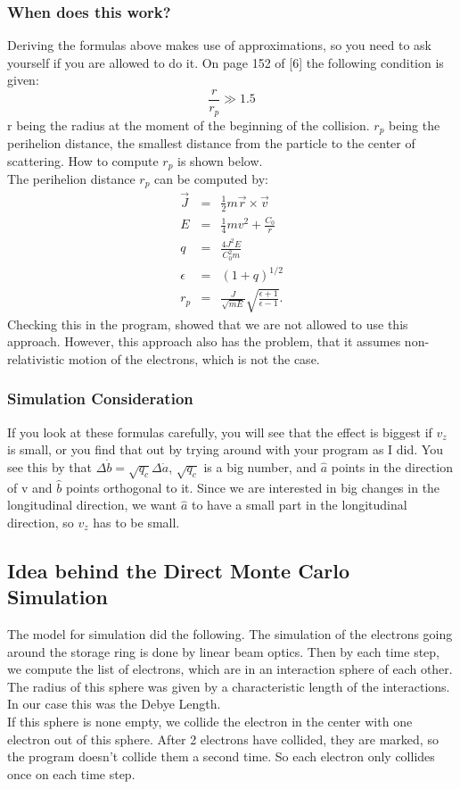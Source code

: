 \subsubsection{When does this work?}
Deriving the formulas above makes use of approximations, so you need to ask yourself if you are allowed to do it. On page 152 of [6] the following condition is given:
\begin{equation} \frac r {r_p} \gg 1.5 \end{equation}
r being the radius at the moment of the beginning of the collision. $r_p$ being the perihelion distance, the smallest distance from the particle to the center of scattering. How to compute $r_p$ is shown below.\\
The perihelion distance $r_p$  can be computed by:
\begin{eqnarray}
\vec J &=& \frac 1 2 m \vec r \times \vec v \\
E &=& \frac 1 4 m v^2 + \frac{C_0} r \\
q &=& \frac{ 4 J^2 E}{C_0^2 m} \\
\epsilon &=& (1 + q)^{1/2} \\
r_p &=& \frac J {\sqrt{m E}} \sqrt{\frac{\epsilon + 1}{\epsilon -1}}.
\end{eqnarray}
Checking this in the program, showed that we are not allowed to use this approach. However, this approach also has the problem, that it assumes non-relativistic motion of the electrons, which is not the case.

\subsubsection{Simulation Consideration}
If you look at these formulas carefully, you will see that the effect is biggest if $v_z$ is small, or you find that out by trying around with your program as I did. You see this by that $\Delta \dot b = \sqrt{q_c} \Delta \dot a$, $\sqrt{q_c}$ is a big number, and $\hat a$ points in the direction of v and $\hat b$ points orthogonal to it. Since we are interested in big changes in the longitudinal direction, we want $\hat a$ to have a small part in the longitudinal direction, so $v_z$ has to be small.

\subsection{Idea behind the Direct Monte Carlo Simulation}
The model for simulation did the following. The simulation of the electrons going around the storage ring is done by linear beam optics. Then by each time step, we compute the list of electrons, which are in an interaction sphere of each other.\\
The radius of this sphere was given by a characteristic length of the interactions. In our case this was the Debye Length.\\
If this sphere is none empty, we collide the electron in the center with one electron out of this sphere. After 2 electrons have collided, they are marked, so the program doesn't collide them a second time. So each electron only collides once on each time step.	
